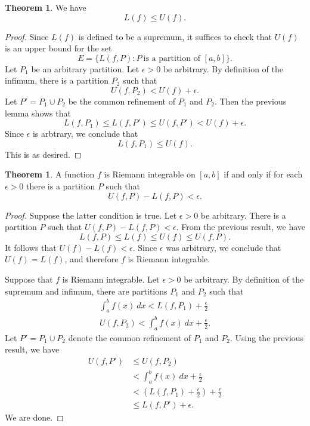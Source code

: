 \documentclass[12pt]{article}
\theoremstyle{definition}
\theoremstyle{theorem}
\newtheorem{theorem}[definition]{Theorem}
\begin{document}
\begin{theorem}
We have 
\[
L(f) \leqslant U(f).
\]
\end{theorem}

\begin{proof}
Since $L(f)$ is defined to be a supremum, it suffices to check that $U(f)$ is an upper bound for the set 
\[
E = \{L(f,P) : P \: \text{is a partition of $[a,b]$}\}.
\]
Let $P_1$ be an arbitrary partition. Let $\epsilon > 0$ be arbitrary. By definition of the infimum, there is a partition $P_2$ such that 
\[
U(f,P_2) < U(f) + \epsilon.
\]
Let $P' = P_1 \cup P_2$ be the common refinement of $P_1$ and $P_2$. Then the previous lemma shows that 
\[
L(f,P_1) \leqslant L(f, P') \leqslant U(f,P') < U(f) + \epsilon.
\]
Since $\epsilon$ is arbtrary, we conclude that 
\[
L(f, P_1) \leqslant U(f). 
\]
This is as desired. 
\end{proof}

\begin{theorem}
A function $f$ is Riemann integrable on $[a,b]$ if and only if for each $\epsilon > 0$ there is a partition $P$ such that 
\[
U(f,P) - L(f,P) < \epsilon.
\]
\end{theorem}

\begin{proof}
Suppose the latter condition is true. Let $\epsilon > 0$ be arbitrary. There is a partition $P$ such that $U(f,P) - L(f,P) < \epsilon$. From the previous result, we have 
\[
L(f,P) \leqslant L(f) \leqslant U(f) \leqslant U(f,P).
\]
It follows that $U(f) - L(f) < \epsilon$. Since $\epsilon$ was arbitrary, we conclude that $U(f)  = L(f)$, and therefore $f$ is Riemann integrable. 

Suppose that $f$ is Riemann integrable. Let $\epsilon > 0$ be arbitrary. By definition of the supremum and infimum, there are partitions $P_1$ and $P_2$ such that 
\begin{align*}
\int_a^b f(x) \: dx < L(f,P_1) + \frac{\epsilon}{2} \\
U(f, P_2) < \int_a^b f(x) \:dx + \frac{\epsilon}{2}.
\end{align*}
Let $P' = P_1 \cup P_2$ denote the common refinement of $P_1$ and $P_2$. Using the previous result, we have  
\begin{align*}
U(f,P') &\leqslant U(f, P_2) \\
&< \int_a^b f(x)\: dx + \frac{\epsilon}{2} \\
&< \left(L(f, P_1) + \frac{\epsilon}{2}\right) + \frac{\epsilon}{2} \\
&\leqslant L(f, P') + \epsilon.
\end{align*}
We are done. 
\end{proof}
\end{document}
